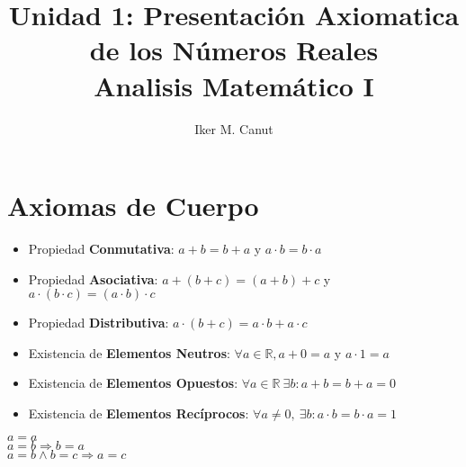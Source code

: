 \documentclass[11pt,a4paper]{article}
\author{Iker M. Canut}
\title{Unidad 1: Presentaci\'on Axiomatica de los N\'umeros Reales\\ Analisis Matem\'atico I}
\begin{document}
\maketitle
\newpage

\section{Axiomas de Cuerpo}
\begin{itemize}
\item Propiedad \textbf{Conmutativa}: $a+b = b+a$ y $a \cdot b = b \cdot a$
\item Propiedad \textbf{Asociativa}: $a+(b+c) = (a+b)+c$ y $a \cdot (b \cdot c) = (a \cdot b) \cdot c$
\item Propiedad \textbf{Distributiva}: $a\cdot (b+c) = a\cdot b + a\cdot c$
\item Existencia de \textbf{Elementos Neutros}: $\forall a \in \mathbb{R}, a+0 = a$ y $a\cdot 1 = a$
\item Existencia de \textbf{Elementos Opuestos}: $\forall a \in \mathbb{R}\ \exists b : a+b = b+a = 0$
\item Existencia de \textbf{Elementos Rec\'iprocos}: $\forall a \not = 0,\ \exists b : a\cdot b = b\cdot a = 1$
\end{itemize}
\noindent \dotfill
\begin{multicols}{3}
$a = a$\\
$a = b \Rightarrow b = a$\\
$a = b \land b = c \Rightarrow a = c$
\end{multicols}
\end{document}
